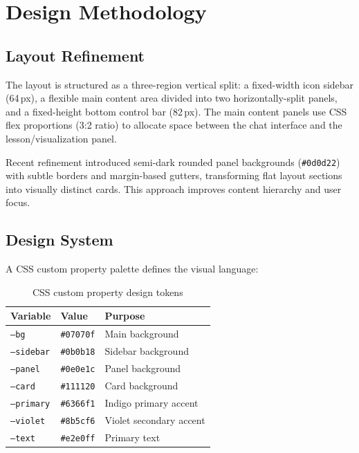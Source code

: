 \documentclass[11pt,a4paper]{article}
\begin{document}
\section{Design Methodology}

\subsection{Layout Refinement}

The layout is structured as a three-region vertical split: a fixed-width icon sidebar (64\,px), a flexible main content area divided into two horizontally-split panels, and a fixed-height bottom control bar (82\,px). The main content panels use CSS flex proportions (3:2 ratio) to allocate space between the chat interface and the lesson/visualization panel.

Recent refinement introduced semi-dark rounded panel backgrounds (\texttt{\#0d0d22}) with subtle borders and margin-based gutters, transforming flat layout sections into visually distinct cards. This approach improves content hierarchy and user focus.

\subsection{Design System}

A CSS custom property palette defines the visual language:

\begin{table}[h]
\centering
\begin{tabular}{lll}
\toprule
Variable & Value & Purpose \\
\midrule
\texttt{--bg} & \texttt{\#07070f} & Main background \\
\texttt{--sidebar} & \texttt{\#0b0b18} & Sidebar background \\
\texttt{--panel} & \texttt{\#0e0e1c} & Panel background \\
\texttt{--card} & \texttt{\#111120} & Card background \\
\texttt{--primary} & \texttt{\#6366f1} & Indigo primary accent \\
\texttt{--violet} & \texttt{\#8b5cf6} & Violet secondary accent \\
\texttt{--text} & \texttt{\#e2e0ff} & Primary text \\
\bottomrule
\end{tabular}
\caption{CSS custom property design tokens}
\label{tab:tokens}
\end{table}
\end{document}
